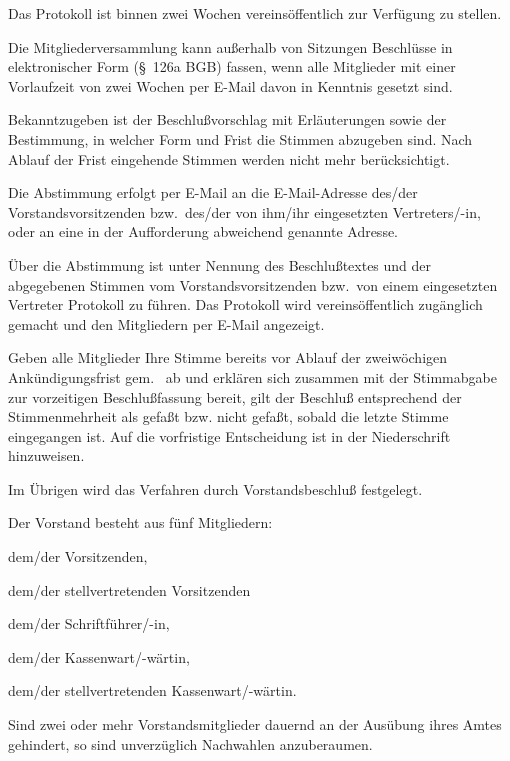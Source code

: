 \documentclass[draft]{scrartcl}
\begin{document}
\begin{contract}
Das Protokoll ist binnen zwei Wochen vereinsöffentlich zur Verfügung zu
stellen.


Die Mitgliederversammlung kann außerhalb von Sitzungen Beschlüsse in
elektronischer Form (§~126a BGB) fassen, wenn alle Mitglieder mit einer
Vorlaufzeit von zwei Wochen per E-Mail davon in Kenntnis gesetzt
sind.\label{eBeschluss}

Bekanntzugeben ist der Beschlußvorschlag mit Erläuterungen sowie der
Bestimmung, in welcher Form und Frist die Stimmen abzugeben sind. Nach Ablauf
der Frist eingehende Stimmen werden nicht mehr berücksichtigt.

Die Abstimmung erfolgt per E-Mail an die E-Mail-Adresse des/der
Vorstandsvorsitzenden bzw.\ des/der von ihm/ihr eingesetzten Vertreters/-in,
oder an eine in der Auf\/forderung abweichend genannte Adresse.

Über die Abstimmung ist unter Nennung des Beschlußtextes und der abgegebenen
Stimmen vom Vorstandsvorsitzenden bzw.\ von einem eingesetzten Vertreter
Protokoll zu führen. Das Protokoll wird vereinsöffentlich zugänglich gemacht
und den Mitgliedern per E-Mail angezeigt.

Geben alle Mitglieder Ihre Stimme bereits vor Ablauf der zweiwöchigen
An\-kün\-di\-gungs\-frist gem.~ ab und erklären sich
zusammen mit der Stimmabgabe zur vorzeitigen Beschlußfassung bereit, gilt der
Beschluß entsprechend der Stimmenmehrheit als gefaßt bzw. nicht gefaßt, sobald
die letzte Stimme eingegangen ist. Auf die vorfristige Entscheidung ist in der
Niederschrift hinzuweisen.

Im Übrigen wird das Verfahren durch Vorstandsbeschluß festgelegt.


Der Vorstand besteht aus fünf Mitgliedern:
\begin{compactenum}[\hspace{2em}1.]
  \item dem/der Vorsitzenden,
  \item dem/der stellvertretenden Vorsitzenden
  \item dem/der Schriftführer/-in,
  \item dem/der Kassenwart/-wärtin,
  \item dem/der stellvertretenden Kassenwart/-wärtin.
\end{compactenum}

Sind zwei oder mehr Vorstandsmitglieder dauernd an der Ausübung ihres Amtes
gehindert, so sind unverzüglich Nachwahlen anzuberaumen.


\end{contract}
\end{document}
